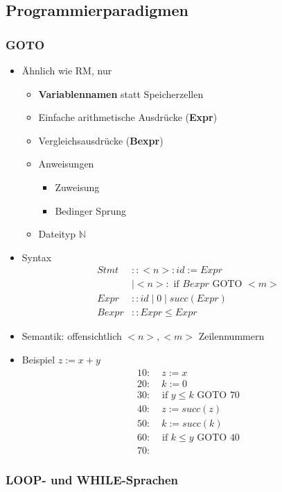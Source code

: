 \documentclass{scrartcl}
\begin{document}
\subsection{Programmierparadigmen}

\subsubsection{GOTO}

\begin{itemize}
	\item Ähnlich wie RM, nur
	\begin{itemize}
		\item \textbf{Variablennamen} statt Speicherzellen
		\item Einfache arithmetische Ausdrücke (\textbf{Expr})
		\item Vergleichsausdrücke (\textbf{Bexpr})
		\item Anweisungen
		\begin{itemize}
			\item Zuweisung
			\item Bedinger Sprung
		\end{itemize}
		\item Dateityp $\mathbb{N}$
	\end{itemize}
	\item Syntax
	\begin{align*}
		Stmt & :: <n> : id := Expr \\
		& \mid <n>: \text{ if } Bexpr \text{ GOTO } <m> \\
		Expr & :: id \mid 0 \mid succ(Expr) \\
		Bexpr & :: Expr \leq Expr
	\end{align*}
	\item Semantik: offensichtlich $<n>,<m>$ Zeilennummern
	\item Beispiel $z := x+y$
	\begin{align*}
		10: & \; z := x \\
		20: & \; k := 0 \\
		30: & \text{ if } y \leq k \text{ GOTO } 70 \\
		40: & \; z := succ(z) \\
		50: & \; k := succ(k) \\
		60: & \text{ if } k \leq y \text{ GOTO } 40 \\
		70: &
	\end{align*}
\end{itemize}

\subsubsection{LOOP- und WHILE-Sprachen}
\end{document}
